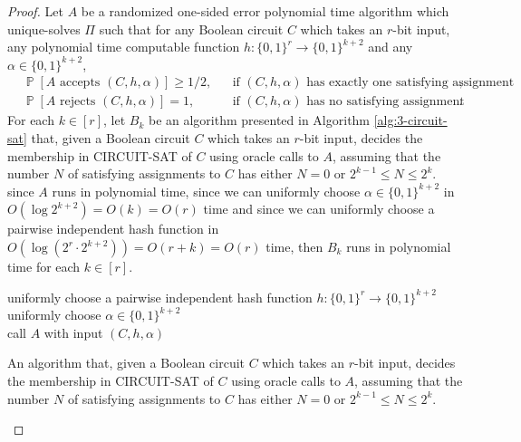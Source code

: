 \documentclass[letterpaper, reqno,11pt]{article}
\newcommand{\PP}{\mathop{{}\mathbb{P}}}
\begin{document}
\begin{enumerate}
  \begin{proof}
    Let $A$ be a randomized one-sided error polynomial time algorithm which unique-solves $\Pi$ such that for any Boolean circuit $C$ which takes an $r$-bit input, any polynomial time computable function $h : \{ 0, 1 \}^r \to \{ 0, 1 \}^{k + 2}$ and any $\alpha \in \{ 0, 1 \}^{k + 2}$,
    \begin{align*}
      & \PP[\text{$A$ accepts $(C, h, \alpha)$}] \geq 1/2, && \text{if $(C, h, \alpha)$ has exactly one satisfying assignment}, \\
      & \PP[\text{$A$ rejects $(C, h, \alpha)$}] = 1, && \text{if $(C, h, \alpha)$ has no satisfying assignment}.
    \end{align*}
    For each $k \in [r]$, let $B_k$ be an algorithm presented in Algorithm \ref{alg:3-circuit-sat} that, given a Boolean circuit $C$ which takes an $r$-bit input, decides the membership in \textsf{CIRCUIT-SAT} of $C$ using oracle calls to $A$, assuming that the number $N$ of satisfying assignments to $C$ has either $N = 0$ or $2^{k - 1} \leq N \leq 2^k$. since $A$ runs in polynomial time, since we can uniformly choose $\alpha \in \{ 0, 1 \}^{k + 2}$ in $O(\log 2^{k + 2}) = O(k) = O(r)$ time and since we can uniformly choose a pairwise independent hash function in $O(\log(2^r \cdot 2^{k + 2})) = O(r + k) = O(r)$ time, then $B_k$ runs in polynomial time for each $k \in [r]$.

    \begin{algorithm}
      uniformly choose a pairwise independent hash function $h : \{ 0, 1 \}^r \to \{ 0, 1 \}^{k + 2}$ \\
      uniformly choose $\alpha \in \{ 0, 1 \}^{k + 2}$ \\
      call $A$ with input $(C, h, \alpha)$ \\
      \caption{An algorithm that, given a Boolean circuit $C$ which takes an $r$-bit input, decides the membership in \textsf{CIRCUIT-SAT} of $C$ using oracle calls to $A$, assuming that the number $N$ of satisfying assignments to $C$ has either $N = 0$ or $2^{k - 1} \leq N \leq 2^k$.}
      \label{alg:3-circuit-sat}
    \end{algorithm}


\end{proof}
\end{enumerate}
\end{document}
